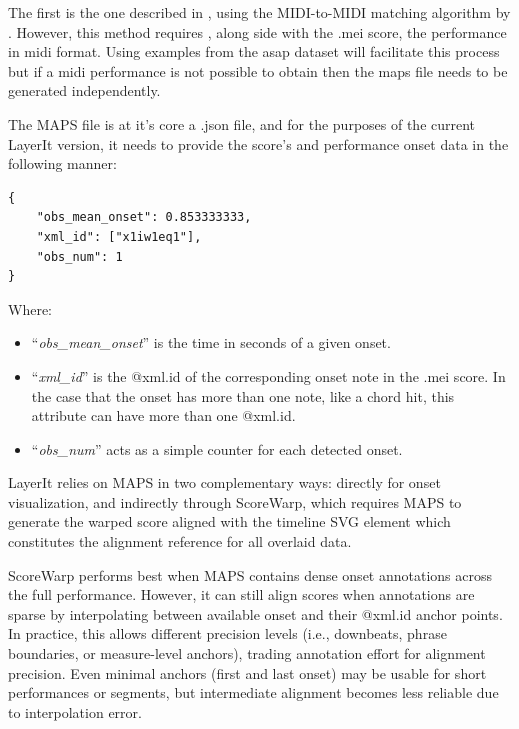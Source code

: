 The first is the one described in \citet{goeblLetsScoreWarpAgain2025a}, using the MIDI-to-MIDI matching algorithm by \citet{nakamuraPERFORMANCEERRORDETECTION}. However,  this method requires , along side with the .mei score, the performance in midi format. Using examples from the asap dataset \cite{peterAutomaticNoteLevelScoretoPerformance2023} will facilitate this process but if a midi performance is not possible to obtain then the maps file needs to be generated independently.

The MAPS file is at it's core a .json file, and for the purposes of the current LayerIt version, it needs to provide the score's and performance onset data in the following manner:

\begin{verbatim}
{
    "obs_mean_onset": 0.853333333,
    "xml_id": ["x1iw1eq1"],
    "obs_num": 1
}
\end{verbatim}

\noindent Where: 

\begin{itemize}
    \item ``\textit{obs\_mean\_onset}'' is the time in seconds of a given onset.
    \item ``\textit{xml\_id}'' is the @xml.id of the corresponding onset note in the .mei score. In the case that the onset has more than one note, like a chord hit, this attribute can have more than one @xml.id. 
    \item ``\textit{obs\_num}'' acts as a simple counter for each detected onset. 
\end{itemize} 

\noindent LayerIt relies on MAPS in two complementary ways: directly for onset visualization, and indirectly through ScoreWarp, which requires MAPS to generate the warped score aligned with the timeline SVG element which constitutes the alignment reference for all overlaid data.

\noindent ScoreWarp performs best when MAPS contains dense onset annotations across the full performance. However, it can still align scores when annotations are sparse by interpolating between available onset and their @xml.id anchor points. In practice, this allows different precision levels (i.e., downbeats, phrase boundaries, or measure-level anchors), trading annotation effort for alignment precision. Even minimal anchors (first and last onset) may be usable for short performances or segments, but intermediate alignment becomes less reliable due to interpolation error.

